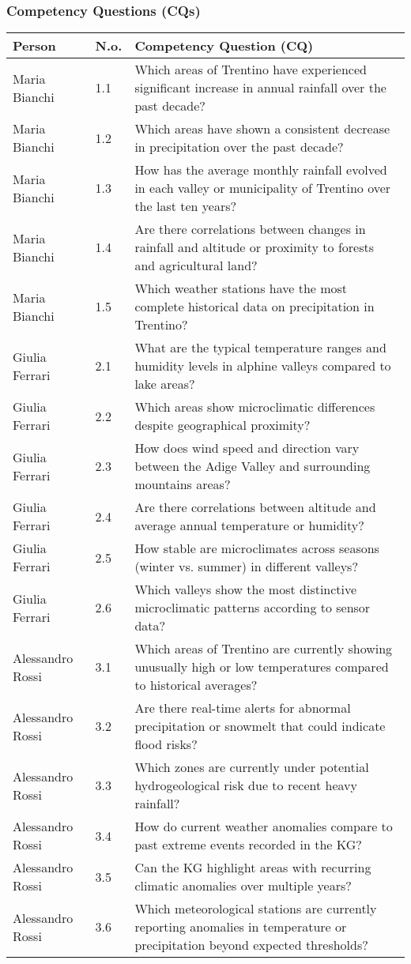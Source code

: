 \subsubsection{Competency Questions (CQs)}
\begin{tabular}{|p{5cm}|p{1cm}|p{10cm}|}
\hline
\textbf{Person} & \textbf{N.o.} & \textbf{Competency Question (CQ)} \\
\hline
Maria Bianchi & 1.1 & Which areas of Trentino have experienced significant increase in annual rainfall over the past decade? \\ Maria Bianchi & 1.2 & Which areas have shown a consistent decrease in precipitation over the past decade? \\ Maria Bianchi & 1.3 & How has the average monthly rainfall evolved in each valley or municipality of Trentino over the last ten years? \\ Maria Bianchi & 1.4 & Are there correlations between changes in rainfall and altitude or proximity to forests and agricultural land?\\ Maria Bianchi & 1.5 & Which weather stations have the most complete historical data on precipitation in Trentino? \\
\hline
Giulia Ferrari & 2.1 & What are the typical temperature ranges and humidity levels in alphine valleys compared to lake areas? \\ Giulia Ferrari & 2.2 & Which areas show microclimatic differences despite geographical proximity? \\ Giulia Ferrari & 2.3 & How does wind speed and direction vary between the Adige Valley and surrounding mountains areas? \\ Giulia Ferrari & 2.4 & Are there correlations between altitude and average annual temperature or humidity? \\ Giulia Ferrari & 2.5 & How stable are microclimates across seasons (winter vs. summer) in different valleys? \\ Giulia Ferrari & 2.6 & Which valleys show the most distinctive microclimatic patterns according to sensor data? \\
\hline
Alessandro Rossi & 3.1 & Which areas of Trentino are currently showing unusually high or low temperatures compared to historical averages? \\ Alessandro Rossi & 3.2 & Are there real-time alerts for abnormal precipitation or snowmelt that could indicate flood risks? \\ Alessandro Rossi & 3.3 & Which zones are currently under potential hydrogeological risk due to recent heavy rainfall? \\ Alessandro Rossi & 3.4 & How do current weather anomalies compare to past extreme events recorded in the KG? \\ Alessandro Rossi & 3.5 & Can the KG highlight areas with recurring climatic anomalies over multiple years? \\ Alessandro Rossi & 3.6 & Which meteorological stations are currently reporting anomalies in temperature or precipitation beyond expected thresholds?\\
\hline

\end{tabular}
